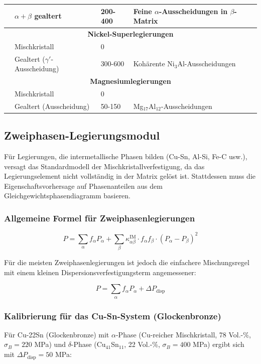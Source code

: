 \documentclass[12pt,a4paper]{article}
\begin{document}
\begin{longtable}{p{3.5cm}p{3.0cm}p{3.0cm}p{4cm}}
	& \(\alpha+\beta\) gealtert & 200-400 & Feine \(\alpha\)-Ausscheidungen in \(\beta\)-Matrix \\
	\hline
	\multicolumn{4}{c}{\textbf{Nickel-Superlegierungen}} \\
	& Mischkristall & 0 & \\
	& Gealtert (\(\gamma'\)-Ausscheidung) & 300-600 & Kohärente Ni\(_3\)Al-Ausscheidungen \\
	\hline
	\multicolumn{4}{c}{\textbf{Magnesiumlegierungen}} \\
	& Mischkristall & 0 & \\
	& Gealtert (Ausscheidung) & 50-150 & Mg\(_{17}\)Al\(_{12}\)-Ausscheidungen \\
	\bottomrule
\end{longtable}

\subsection{Zweiphasen-Legierungsmodul}
\label{subsec:two-phase-alloys}

Für Legierungen, die intermetallische Phasen bilden (Cu-Sn, Al-Si, Fe-C usw.), versagt das Standardmodell der Mischkristallverfestigung, da das Legierungselement nicht vollständig in der Matrix gelöst ist. Stattdessen muss die Eigenschaftsvorhersage auf Phasenanteilen aus dem Gleichgewichtsphasendiagramm basieren.

\subsubsection{Allgemeine Formel für Zweiphasenlegierungen}

\begin{equation}
	\boxed{P = \sum_{\alpha} f_{\alpha} P_{\alpha} + \sum_{\beta} \kappa_{\alpha\beta}^{\text{IM}} \cdot f_{\alpha} f_{\beta} \cdot (P_{\alpha} - P_{\beta})^2}
	\label{eq:two-phase-alloy}
\end{equation}

Für die meisten Zweiphasenlegierungen ist jedoch die einfachere Mischungsregel mit einem kleinen Dispersionsverfestigungsterm angemessener:

\begin{equation}
	\boxed{P = \sum_{\alpha} f_{\alpha} P_{\alpha} + \Delta P_{\text{disp}}}
	\label{eq:two-phase-simple}
\end{equation}

\subsubsection{Kalibrierung für das Cu-Sn-System (Glockenbronze)}
Für Cu-22Sn (Glockenbronze) mit \(\alpha\)-Phase (Cu-reicher Mischkristall, 78 Vol.-\%, \(\sigma_B=220\) MPa) und \(\delta\)-Phase (Cu\(_{41}\)Sn\(_{11}\), 22 Vol.-\%, \(\sigma_B=400\) MPa) ergibt sich mit \(\Delta P_{\text{disp}}=50\) MPa:
\end{document}
